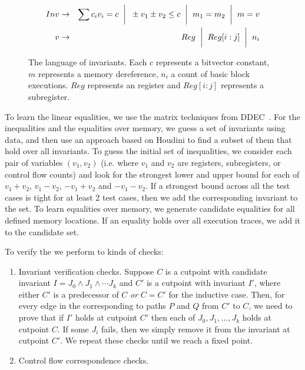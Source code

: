 \begin{figure}\label{invlang}
\begin{eqnarray*}
Inv &\rightarrow& \sum c_iv_i = c \hspace{2mm}\bigg|\hspace{2mm} \pm v_1 \pm v_2 \leq c \hspace{2mm}\bigg|\hspace{2mm} m_1 = m_2 \hspace{2mm}\bigg|\hspace{2mm} m = v\\
v   &\rightarrow& Reg \hspace{2mm}\bigg|\hspace{2mm}  Reg[i:j]  \hspace{2mm}\bigg|\hspace{2mm} n_i\\
\end{eqnarray*}
\caption{The language of invariants.  Each $c$ represents a bitvector constant, $m$ represents a memory dereference, $n_i$ a count of basic block executions.  $Reg$ represents an \arch{} register and $Reg[i:j]$ represents a subregister.}
\end{figure}

To learn the linear equalities, we use the matrix techniques from
DDEC~\cite{Sharma2013}. For the inequalities and the equalities over
memory, we guess a set of invariants using data, and then use an
approach based on Houdini to find a subset of them that
hold over all invariants. To guess the initial set of inequalities,
we consider each pair of variables $(v_1, v_2)$ (i.e. where $v_1$ and
$v_2$ are registers, subregisters, or control flow counts) and look
for the strongest lower and upper bound for each of $v_1 + v_2$, $v_1
- v_2$, $-v_1 + v_2$ and $-v_1-v_2$. If a strongest bound across all
the test cases is tight for at least 2 test cases, then we add the
corresponding invariant to the set. To learn equalities over memory,
we generate candidate equalities for all defined memory locations.
If an equality holds over all execution traces, we add it to the
candidate set.

To verify the \bisimrep{} we perform to kinds of checks:

\begin{enumerate}
\item Invariant verification checks. Suppose $C$ is a cutpoint with
candidate invariant $I = J_0 \wedge J_1 \wedge \dotsm J_k$ and $C'$ is
a cutpoint with invariant $I'$, where either $C'$ is a predecessor of
$C$ \emph{or} $C = C'$ for the inductive case. Then, for every edge
in the \bisimrep{} corresponding to paths $P$ and $Q$ from $C'$ to
$C$, we need to prove that if $I'$ holds at cutpoint $C'$ then each of
$J_0,J_1,\dotsc,J_k$ holds at cutpoint $C$. If some $J_i$ fails, then
we simply remove it from the invariant at cutpoint $C'$. We repeat
these checks until we reach a fixed point.
\item Control flow correspondence checks.
\end{enumerate}
